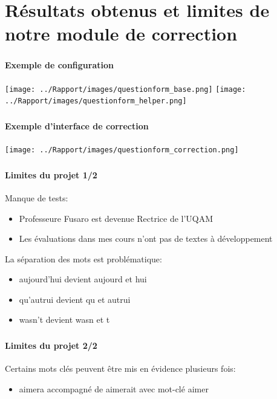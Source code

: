\documentclass{beamer}
\begin{document}
  \section[R\'esultats]{R\'esultats obtenus et limites de notre module de correction}
  \begin{frame}
  \frametitle{\insertsection}
  \framesubtitle{Exemple de configuration}
  \begin{center}
    \texttt{[image: ../Rapport/images/questionform\_base.png]}
    \texttt{[image: ../Rapport/images/questionform\_helper.png]}
  \end{center}
  \end{frame}
  
  \begin{frame}
  \frametitle{\insertsection}
  \framesubtitle{Exemple d'interface de correction}
  \begin{center}
    \texttt{[image: ../Rapport/images/questionform\_correction.png]}
  \end{center}
  \end{frame}
  
  \begin{frame}
  \frametitle{\insertsection}
  \framesubtitle{Limites du projet 1/2}
  Manque de tests:
  \begin{itemize}
    \item Professeure Fusaro est devenue Rectrice de l'UQAM
    \item Les \'evaluations dans mes cours n'ont pas de textes \`a d\'eveloppement
  \end{itemize}
  
  \bigskip
  
  La s\'eparation des mots est probl\'ematique:
  \begin{itemize}
    \item aujourd'hui devient \og aujourd \fg{} et \og hui \fg{} 
    \item qu'autrui devient \og qu \fg{} et \og autrui \fg{} 
    \item wasn't devient \og wasn \fg{} et \og t \fg{} 
  \end{itemize}
  \end{frame}
  
  \begin{frame}
  \frametitle{\insertsection}
  \framesubtitle{Limites du projet 2/2}
  Certains mots cl\'es peuvent \^etre mis en \'evidence plusieurs fois:
  \begin{itemize}
    \item aimera accompagn\'e de aimerait avec mot-cl\'e aimer
  \end{itemize}
  \end{frame}
  
\end{document}
